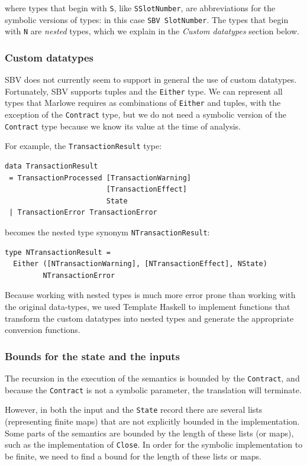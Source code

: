 \documentclass[runningheads]{llncs}
\begin{document}
\noindent
where types that begin with \texttt{S}, like \texttt{SSlotNumber}, are abbreviations for the symbolic versions of types: in this case \texttt{SBV SlotNumber}.
The types that begin with \texttt{N} are \textit{nested} types, which we explain in the \textit{Custom datatypes} section below.

\subsubsection{Custom datatypes}

SBV does not currently seem to support in general the use of custom datatypes. Fortunately, SBV supports tuples and the \texttt{Either} type. We can represent all types that Marlowe requires as combinations of \texttt{Either} and tuples, with the exception of the \texttt{Contract} type, but we do not need a symbolic version of the \texttt{Contract} type because we know its value at the time of analysis.

\noindent
For example, the \texttt{TransactionResult} type:
\begin{verbatim}
data TransactionResult
 = TransactionProcessed [TransactionWarning]
                        [TransactionEffect]
                        State
 | TransactionError TransactionError
\end{verbatim}
\noindent
becomes the nested type synonym \texttt{NTransactionResult}:

\begin{verbatim}
type NTransactionResult =
  Either ([NTransactionWarning], [NTransactionEffect], NState)
         NTransactionError
\end{verbatim}

\noindent
Because working with nested types is much more error prone than working with the original data-types, we used Template Haskell \cite{sheard2002template} to implement functions that transform the custom datatypes into nested types and generate the appropriate conversion functions.

\subsubsection{Bounds for the state and the inputs}

The recursion in the execution of the semantics is bounded by the \texttt{Contract}, and because the \texttt{Contract} is not a symbolic parameter, the translation will terminate.

However, in both the input and the \texttt{State} record there are several lists (representing finite maps) that are not explicitly bounded in the implementation. Some parts of the semantics are bounded by the length of these lists (or maps), such as the implementation of \texttt{Close}.
In order for the symbolic implementation to be finite, we need to find a bound for the length of these lists or maps.
\end{document}

